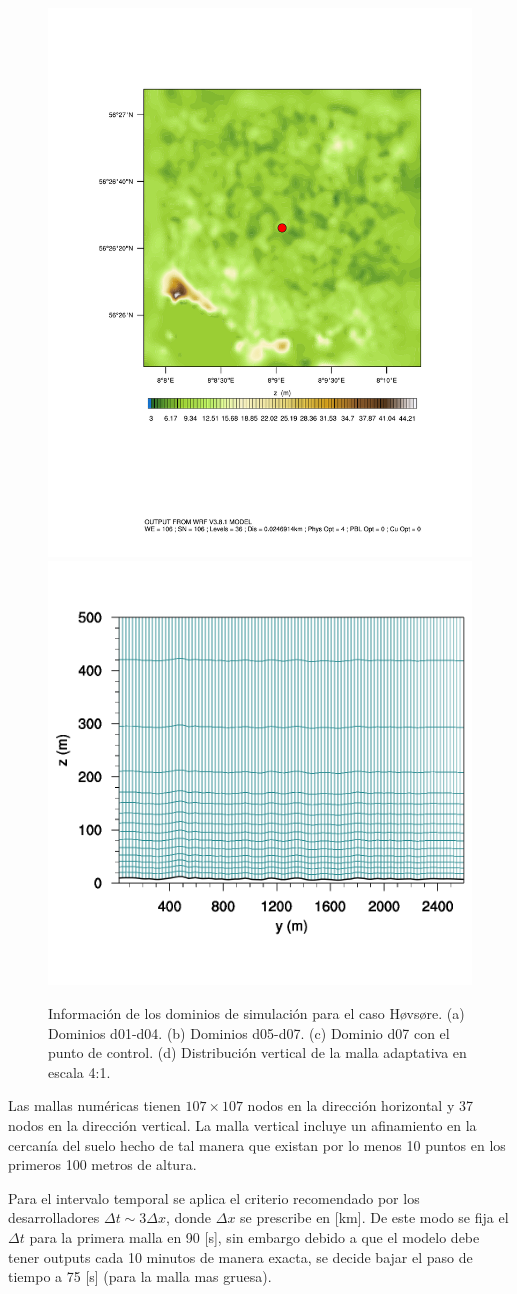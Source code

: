\begin{figure}[H]
	\includegraphics[width=0.45\linewidth,trim={2.5cm 6.5cm 2cm 3.5cm},clip]{Imagenes/05/hov_control_point.pdf}%
	\includegraphics[width=0.45\linewidth,trim={0.5cm 0cm 0cm -1.3cm},clip]{Imagenes/05/mesh57}%
	
	\caption{Información de los dominios de simulación para el caso Høvsøre. (a) Dominios d01-d04. (b) Dominios d05-d07. (c) Dominio d07 con el punto de control. (d) Distribución vertical de la malla adaptativa en escala 4:1.}
	\label{fig:05_dom_hov}
\end{figure}

Las mallas numéricas tienen $107\times107$ nodos en la dirección horizontal y 37 nodos en la dirección vertical. La malla vertical incluye un afinamiento en la cercanía del suelo hecho de tal manera que existan por lo menos 10 puntos en los primeros 100 metros de altura. 

Para el intervalo temporal se aplica el criterio recomendado por los desarrolladores $\Delta t \sim 3\Delta x$, donde $\Delta x$ se prescribe en [km]. De este modo se fija el $\Delta t$ para la primera malla en 90 [s], sin embargo debido a que el modelo debe tener outputs cada 10 minutos de manera exacta, se decide bajar el paso de tiempo a 75 [s] (para la malla mas gruesa).

